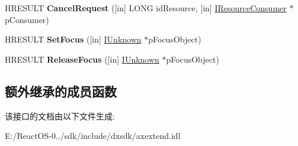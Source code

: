 \begin{DoxyCompactItemize}
H\+R\+E\+S\+U\+LT {\bfseries Cancel\+Request} (\mbox{[}in\mbox{]} L\+O\+NG id\+Resource, \mbox{[}in\mbox{]} \hyperlink{interface_i_resource_consumer}{I\+Resource\+Consumer} $\ast$p\+Consumer)
\item 
\mbox{\label{interface_i_resource_manager_a06bbbcd4fbaf787bfa50360ea825069a}} 
H\+R\+E\+S\+U\+LT {\bfseries Set\+Focus} (\mbox{[}in\mbox{]} \hyperlink{interface_i_unknown}{I\+Unknown} $\ast$p\+Focus\+Object)
\item 
\mbox{\label{interface_i_resource_manager_ae9d6639263a52d7a2727821144be90f3}} 
H\+R\+E\+S\+U\+LT {\bfseries Release\+Focus} (\mbox{[}in\mbox{]} \hyperlink{interface_i_unknown}{I\+Unknown} $\ast$p\+Focus\+Object)
\end{DoxyCompactItemize}
\subsection*{额外继承的成员函数}


该接口的文档由以下文件生成\+:\begin{DoxyCompactItemize}
\item 
E\+:/\+React\+O\+S-\/0../sdk/include/dxsdk/axextend.\+idl\end{DoxyCompactItemize}
